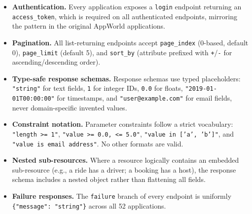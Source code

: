 \documentclass[11pt]{article}
\begin{document}
\begin{itemize}[leftmargin=1.5em, itemsep=2pt]
    \item \textbf{Authentication.} Every application exposes a \texttt{login} endpoint returning an \texttt{access\_token}, which is required on all authenticated endpoints, mirroring the pattern in the original AppWorld applications.
    \item \textbf{Pagination.} All list-returning endpoints accept \texttt{page\_index} (0-based, default 0), \texttt{page\_limit} (default 5), and \texttt{sort\_by} (attribute prefixed with \texttt{+}/\texttt{-} for ascending/descending order).
    \item \textbf{Type-safe response schemas.} Response schemas use typed placeholders: \texttt{"string"} for text fields, \texttt{1} for integer IDs, \texttt{0.0} for floats, \texttt{"2019-01-01T00:00:00"} for timestamps, and \texttt{"user@example.com"} for email fields, never domain-specific invented values.
    \item \textbf{Constraint notation.} Parameter constraints follow a strict vocabulary: \texttt{"length >= 1"}, \texttt{"value >= 0.0, <= 5.0"}, \texttt{"value in ['a', 'b']"}, and \texttt{"value is email address"}. No other formats are valid.
    \item \textbf{Nested sub-resources.} Where a resource logically contains an embedded sub-resource (e.g., a ride has a driver; a booking has a host), the response schema includes a nested object rather than flattening all fields.
    \item \textbf{Failure responses.} The \texttt{failure} branch of every endpoint is uniformly \texttt{\{"message": "string"\}} across all 52 applications.
\end{itemize}

\end{document}
